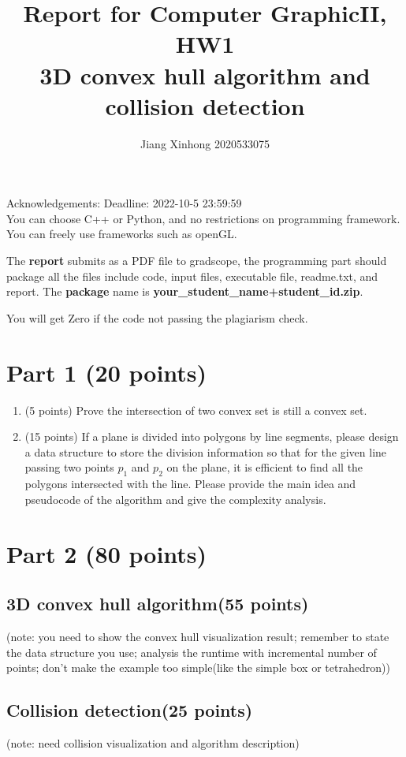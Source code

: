 \documentclass[]{article}
\title{Report for Computer GraphicII, HW1 \\ 3D convex hull algorithm and collision detection}
\author{Jiang Xinhong 2020533075}
\begin{document}
\maketitle
Acknowledgements:
Deadline: 2022-10-5 23:59:59
\\

You can choose C++ or Python, and no restrictions on programming framework. You can freely use frameworks such as openGL.

The \textbf{report} submits as a PDF file to gradscope, the programming part should package all the files include code, input files, executable file, readme.txt, and report. The \textbf{package} name is  \textbf{your\_student\_name+student\_id.zip}.

You will get Zero if the code not passing the plagiarism check.
\newpage
\section{Part 1 (20 points)}
\begin{enumerate}
\item  (5 points) Prove the intersection of two convex set is still a convex set.


\item  (15 points) If a plane is divided into polygons by line segments, please design a data structure to store the division information so that for the given line passing two points  $p_1$ and $p_2$ on the plane, it is efficient to find all the polygons intersected with the line. Please provide the main idea and pseudocode of the algorithm and give the complexity analysis.


\end{enumerate}
\newpage
\section{Part 2 (80 points)}
\subsection{3D convex hull algorithm(55 points)}
(note: you need to show the convex hull visualization result; 
remember to state the data structure you use; analysis the runtime with incremental number of points;  don't make the example too simple(like the simple box or tetrahedron))

\newpage
\subsection{Collision detection(25 points)}
(note: need collision visualization and algorithm description)
\end{document}
